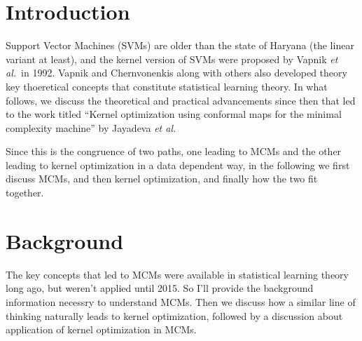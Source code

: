 \documentclass[11pt]{article}
\newcommand{\etal}{{\em et al.}}
\begin{document}


\section{Introduction}
Support Vector Machines (SVMs) are older than the state of Haryana (the linear variant at
least), and the kernel version of SVMs were proposed by Vapnik \etal\ in 1992. Vapnik and
Chernvonenkis along with others also developed theory key thoeretical concepts that
constitute statistical learning theory. In what follows, we discuss the theoretical
and practical advancements since then that led to the work titled ``Kernel optimization
using conformal maps for the minimal complexity machine'' by Jayadeva \etal\par
Since this is the congruence of two paths, one leading to MCMs and the other leading to
kernel optimization in a data dependent way, in the following we first discuss MCMs, and
then kernel optimization, and finally how the two fit together.


\section{Background}
The key concepts that led to MCMs were available in statistical learning theory long ago,
but weren't applied until 2015. So I'll provide the background information
necessry to understand MCMs. Then we discuss how a similar line of thinking
naturally leads to kernel optimization, followed by a discussion about
application of kernel optimization in MCMs.
\end{document}
